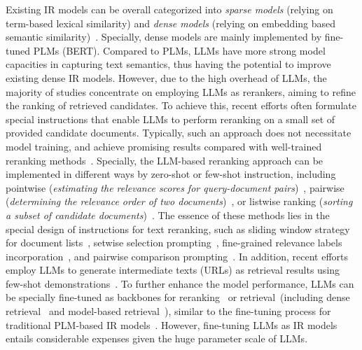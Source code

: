 {Existing IR models can be overall categorized into \emph{sparse models} (relying on term-based lexical similarity) and \emph{dense models} (relying on embedding based semantic similarity)~\cite{Zhao-arxiv-2022-Calibrating}.  Specially, dense models are mainly implemented by fine-tuned PLMs (\eg BERT).   
Compared to PLMs, LLMs have more strong model capacities in capturing text semantics, thus having the potential to improve existing dense IR models. 
However, due to the high overhead of LLMs, %
the majority of studies concentrate on employing LLMs as rerankers, aiming to refine the ranking of retrieved candidates. %
To achieve this, recent efforts often formulate special instructions that enable LLMs to perform reranking on a small set of provided candidate documents. Typically, such an approach does not necessitate model training, and achieve promising results compared with well-trained reranking methods~\cite{sun-arxiv-2023-chatgpt, qin-arxiv-2023-large}. 
Specially, the LLM-based reranking approach can be implemented in different ways by zero-shot or few-shot instruction, including  pointwise (\emph{estimating the relevance scores for query-document pairs})~\cite{Cho-ACL-2023-Discrete}, pairwise (\emph{determining the  relevance order of two documents})~\cite{qin-arxiv-2023-large}, or listwise ranking (\emph{sorting a subset of candidate documents})~\cite{tang-arxiv-2023-found}.  
{The essence of these methods lies in the special design of  instructions for text reranking, such as sliding window strategy for document lists~\cite{sun-arxiv-2023-chatgpt, ma-arxiv-2023-zero}, setwise selection prompting~\cite{zhuang-arxiv-2023-setwise}, fine-grained relevance labels incorporation~\cite{zhuang-arxiv-2023-beyond}, and pairwise comparison prompting~\cite{qin-arxiv-2023-large}.}
In addition, recent efforts employ LLMs to generate intermediate texts (\eg URLs) as retrieval results using few-shot demonstrations~\cite{ziems-arxiv-2023-large}.
To further enhance the model performance, LLMs can be specially fine-tuned as  backbones for reranking~\cite{Ma-arxiv-2023-fine, pradeep-arxiv-2023-rankvicuna} or retrieval~(including dense retrieval~\cite{Zhao-arxiv-2022-Dense} and model-based retrieval~\cite{Tay-NIPS-2022-transformer, Ren-ACL-2023-tome}), similar to the fine-tuning process for traditional PLM-based IR models~\cite{Ma-arxiv-2023-fine}. However, fine-tuning LLMs as IR models entails considerable expenses given the huge parameter scale of LLMs.
}



